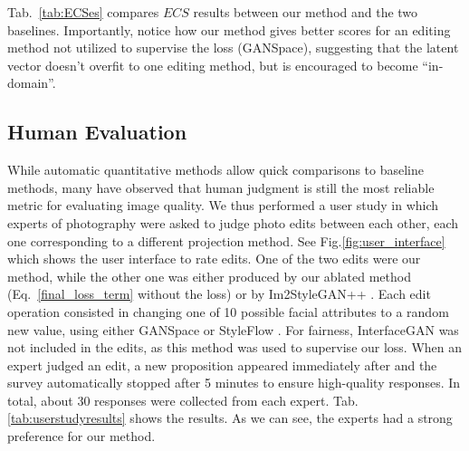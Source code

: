 Tab.~\ref{tab:ECSes} compares $ECS$ results between our method and the two baselines. 
Importantly, notice how our method gives better scores for an editing method not utilized 
to supervise the loss (GANSpace), suggesting that the latent vector doesn't overfit to
 one editing method, but is encouraged to become ``in-domain''.

\subsection{Human Evaluation}

While automatic quantitative methods allow quick 
comparisons to baseline methods, many have observed \citep{hype} that human judgment is 
still the most reliable metric for evaluating image quality. We thus performed a user 
study in which experts of photography were asked to judge photo edits between each other,
 each one corresponding to a different projection method. See Fig.\ref{fig:user_interface}
 which shows the user interface to rate edits.
 One of the two edits were our 
 method, while the other one was either produced by our  ablated method 
 (Eq.~\ref{final_loss_term} without the \magec loss) or by Im2StyleGAN++ \citep{abdal2020}.
 Each edit operation consisted in changing one of 10 possible facial attributes
 to a random new value, using either GANSpace \citep{harkonen2020ganspace} or 
 StyleFlow \citep{abdal2020styleflow}. For fairness, InterfaceGAN \citep{shen2020} was not included 
 in the edits, as this method was used to supervise our loss. When an expert judged an edit, 
 a new proposition appeared immediately after and the survey automatically stopped after 5 minutes 
 to ensure high-quality responses. In total, about 30 responses were collected from each expert. 
Tab. \ref{tab:userstudyresults} shows the results. As we can see, the experts had a 
strong preference for our method.
 
 

